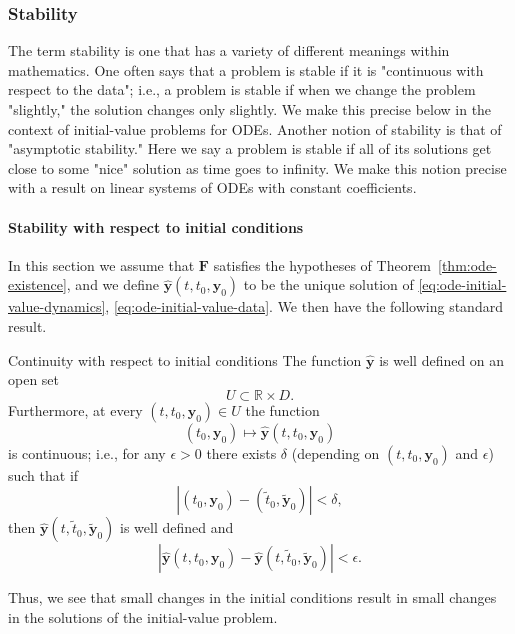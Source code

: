 \subsubsection{Stability}\label{subsec:stability}

The term stability is one that has a variety of different meanings within mathematics. One often says that a problem is stable if it is "continuous with respect to the data"; i.e., a problem is stable if when we change the problem "slightly," the solution changes only slightly. We make this precise below in the context of initial-value problems for ODEs. Another notion of stability is that of "asymptotic stability." Here we say a problem is stable if all of its solutions get close to some "nice" solution as time goes to infinity. We make this notion precise with a result on linear systems of ODEs with constant coefficients.

\paragraph*{Stability with respect to initial conditions}

In this section we assume that $\bm{F}$ satisfies the hypotheses of Theorem~\ref{thm:ode-existence}, and we define $\hat{\bm{y}}(t,t_0,\bm{y}_0)$ to be the unique solution of \eqref{eq:ode-initial-value-dynamics}, \eqref{eq:ode-initial-value-data}. We then have the following standard result.

\begin{Theorem}{Continuity with respect to initial conditions}
\label{thm:initial-data-continuity}
The function $\hat{\bm{y}}$ is well defined on an open set
\[
U\subset\mathbb{R}\times D.
\]
Furthermore, at every $(t,t_0,\bm{y}_0)\in U$ the function
\[
(t_0,\bm{y}_0)\mapsto\hat{\bm{y}}(t,t_0,\bm{y}_0)
\]
is continuous; i.e., for any $\epsilon>0$ there exists $\delta$ (depending on $(t,t_0,\bm{y}_0)$ and $\epsilon$) such that if
\[
|(t_0,\bm{y}_0)-(\tilde{t}_0,\tilde{\bm{y}}_0)|<\delta,
\]
then $\hat{\bm{y}}(t,\tilde{t}_0,\tilde{\bm{y}}_0)$ is well defined and
\begin{equation}\label{eq:initial-data-continuity}
|\hat{\bm{y}}(t,t_0,\bm{y}_0)-\hat{\bm{y}}(t,\tilde{t}_0,\tilde{\bm{y}}_0)|<\epsilon.
\end{equation}
\end{Theorem}

Thus, we see that small changes in the initial conditions result in small changes in the solutions of the initial-value problem.
